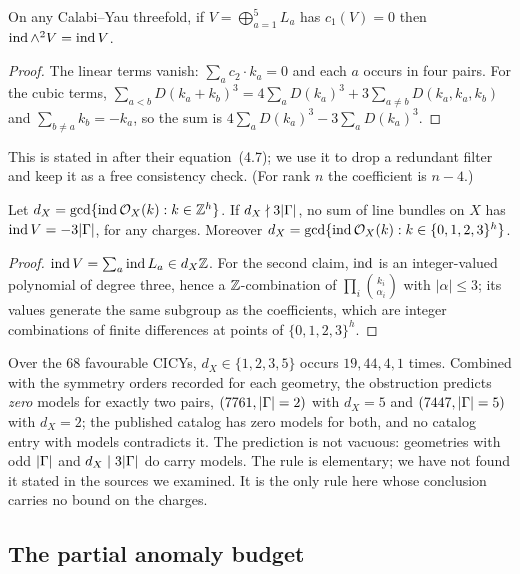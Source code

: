 \begin{proposition}\label{prop:indexidentity}
On any Calabi--Yau threefold, if $V=\bigoplus_{a=1}^5L_a$ has $c_1(V)=0$ then
$\operatorname{ind}\wedge^2V=\operatorname{ind} V$.
\end{proposition}
\begin{proof}
The linear terms vanish: $\sum_ac_2\cdot k_a=0$ and each $a$ occurs in four
pairs. For the cubic terms,
$\sum_{a<b}D(k_a+k_b)^3=4\sum_aD(k_a)^3+3\sum_{a\ne b}D(k_a,k_a,k_b)$ and
$\sum_{b\ne a}k_b=-k_a$, so the sum is $4\sum_aD(k_a)^3-3\sum_aD(k_a)^3$.
\end{proof}
This is stated in \cite{ACGLP2013} after their equation~(4.7); we use it to
drop a redundant filter and keep it as a free consistency check. (For rank $n$
the coefficient is $n-4$.)

\begin{proposition}\label{prop:divisibility}
Let $d_X=\gcd\{\operatorname{ind}\mathcal{O}_X(k):k\in\mathbb{Z}^h\}$. If $d_X\nmid3|\Gamma|$, no sum of line
bundles on $X$ has $\operatorname{ind} V=-3|\Gamma|$, for any charges. Moreover
$d_X=\gcd\{\operatorname{ind}\mathcal{O}_X(k):k\in\{0,1,2,3\}^h\}$.
\end{proposition}
\begin{proof}
$\operatorname{ind} V=\sum_a\operatorname{ind} L_a\in d_X\mathbb{Z}$. For the second claim, $\operatorname{ind}$ is an
integer-valued polynomial of degree three, hence a $\mathbb{Z}$-combination of
$\prod_i\binom{k_i}{\alpha_i}$ with $|\alpha|\le3$; its values generate the same
subgroup as the coefficients, which are integer combinations of finite
differences at points of $\{0,1,2,3\}^h$.
\end{proof}

Over the 68 favourable CICYs, $d_X\in\{1,2,3,5\}$ occurs $19,44,4,1$ times.
Combined with the symmetry orders recorded for each geometry, the obstruction
predicts \emph{zero} models for exactly two pairs, $(7761,|\Gamma|=2)$ with $d_X=5$
and $(7447,|\Gamma|=5)$ with $d_X=2$; the published catalog has zero models for
both, and no catalog entry with models contradicts it. The prediction is not
vacuous: geometries with odd $|\Gamma|$ and $d_X\mid3|\Gamma|$ do carry models.
The rule is elementary; we have not found it stated in the sources we examined.
It is the only rule here whose conclusion carries no bound on the charges.

\subsection{The partial anomaly budget}

